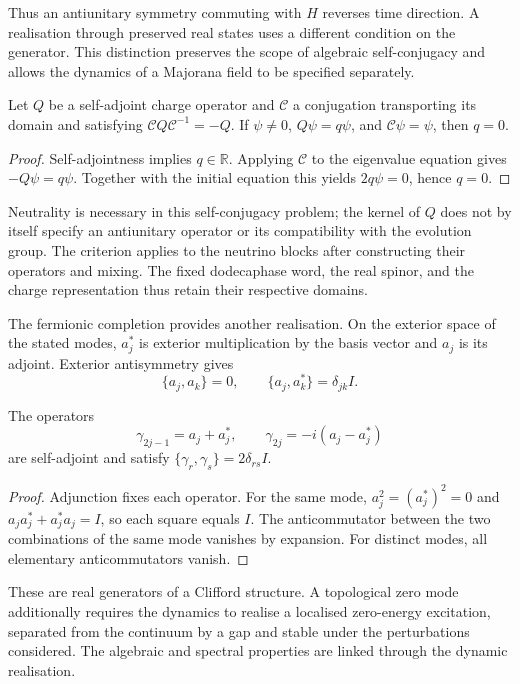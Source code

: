 Thus an antiunitary symmetry commuting with $H$ reverses time
direction. A realisation through preserved real states uses
a different condition on the generator. This distinction preserves the scope
of algebraic self-conjugacy and allows the dynamics of a Majorana
field to be specified separately.

\begin{proposition}
\label{vi:prop:carga-real}
Let $Q$ be a self-adjoint charge operator and $\mathcal C$ a
conjugation transporting its domain and satisfying
$\mathcal C Q\mathcal C^{-1}=-Q$. If $\psi\ne0$,
$Q\psi=q\psi$, and $\mathcal C\psi=\psi$, then $q=0$.
\end{proposition}
\begin{proof}
Self-adjointness implies $q\in\mathbb R$. Applying $\mathcal C$
to the eigenvalue equation gives $-Q\psi=q\psi$. Together with the initial equation
this yields $2q\psi=0$, hence $q=0$.
\end{proof}

Neutrality is necessary in this self-conjugacy problem;
the kernel of $Q$ does not by itself specify an antiunitary operator
or its compatibility with the evolution group. The criterion applies to the
neutrino blocks after constructing their operators and mixing.
The fixed dodecaphase word, the real spinor, and the charge
representation thus retain their respective domains.

The fermionic completion provides another realisation. On the
exterior space of the stated modes, $a_j^*$ is exterior
multiplication by the basis vector and $a_j$ is its adjoint. Exterior
antisymmetry gives
\[
 \{a_j,a_k\}=0,\qquad \{a_j,a_k^*\}=\delta_{jk}I.
\]

\begin{proposition}
\label{vi:prop:car-real}
The operators
\[
 \gamma_{2j-1}=a_j+a_j^*,\qquad
 \gamma_{2j}=-i(a_j-a_j^*)
\]
are self-adjoint and satisfy $\{\gamma_r,\gamma_s\}=2\delta_{rs}I$.
\end{proposition}
\begin{proof}
Adjunction fixes each operator. For the same mode,
$a_j^2=(a_j^*)^2=0$ and $a_ja_j^*+a_j^*a_j=I$, so each
square equals $I$. The anticommutator between the two combinations
of the same mode vanishes by expansion. For distinct modes,
all elementary anticommutators vanish.
\end{proof}

These are real generators of a Clifford structure. A topological zero
mode additionally requires the dynamics to realise a localised
zero-energy excitation, separated from the continuum by a gap and
stable under the perturbations considered. The algebraic and spectral
properties are linked through the dynamic realisation.

